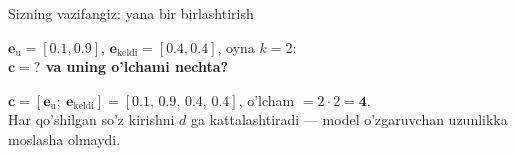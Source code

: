 \documentclass[aspectratio=169,11pt]{beamer}
\begin{document}
\begin{frame}{Sizning vazifangiz: yana bir birlashtirish}
  \begin{tcolorbox}[warnbox,title=Savol --- 60 soniya]
    \small
    $\mathbf{e}_{\text{u}}=[0.1,0.9]$, \quad $\mathbf{e}_{\text{keldi}}=[0.4,0.4]$,
    oyna $k=2$:\\[4pt]
    \textbf{\large $\mathbf{c} = ?$ \quad va uning o'lchami nechta?}
  \end{tcolorbox}
  \pause
  \begin{tcolorbox}[okbox,title=Javob]
    \small
    $\mathbf{c} = [\mathbf{e}_{\text{u}};\ \mathbf{e}_{\text{keldi}}]
       = [0.1,\,0.9,\,0.4,\,0.4]$, \quad o'lcham $= 2\cdot 2 = \mathbf{4}$.\\[3pt]
    \footnotesize Har qo'shilgan so'z kirishni $d$ ga kattalashtiradi --- model
    o'zgaruvchan uzunlikka moslasha olmaydi.
  \end{tcolorbox}
\end{frame}
\end{document}
